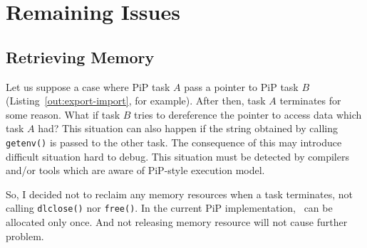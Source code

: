 
\section{Remaining Issues}

\subsection{Retrieving Memory}\label{sec:retrive}

Let us suppose a case where PiP task $A$ pass a pointer to PiP task
$B$ (Listing~\ref{out:export-import}, for example). After then, task
$A$ terminates for some reason. What if task $B$ tries to dereference
the pointer to access data which task $A$ had? This situation can also
happen if the string obtained by calling {\tt getenv()} is passed to
the other task. The consequence of this may introduce difficult
situation hard to debug. This situation must be detected by compilers
and/or tools which are aware of PiP-style execution model.

So, I decided not to reclaim any memory resources when a task
terminates, not calling {\tt dlclose()} nor {\tt free()}. In the
current PiP implementation, \PIPID\ can be allocated only once. And
not releasing memory resource will not cause further problem.
